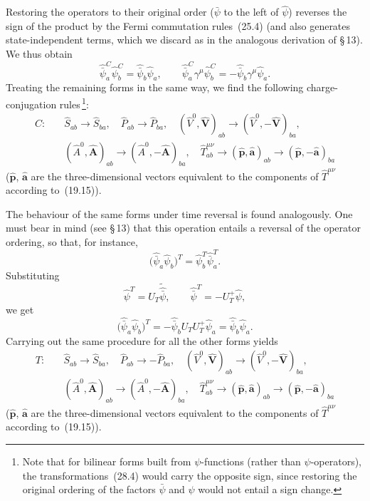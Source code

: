 Restoring the operators to their original order ($\bar\psi$ to the left of $\widehat\psi$) reverses the sign of the product by the Fermi commutation rules~(25.4) (and also generates state-independent terms, which we discard as in the analogous derivation of \S\,13). We thus obtain
\[
\widehat{\bar\psi}^C_a\widehat\psi^C_b = \widehat{\bar\psi}_b\widehat\psi_a,\qquad \widehat{\bar\psi}^C_a\gamma^\mu\widehat\psi^C_b = -\widehat{\bar\psi}_b\gamma^\mu\widehat\psi_a.
\]
Treating the remaining forms in the same way, we find the following charge-conjugation rules\,\footnote{Note that for bilinear forms built from $\psi$-functions (rather than $\psi$-operators), the transformations~(28.4) would carry the opposite sign, since restoring the original ordering of the factors $\bar\psi$ and $\psi$ would not entail a sign change.}:
\begin{equation}
\begin{aligned}
C:\quad &\widehat S_{ab} \to \widehat S_{ba},\quad \widehat P_{ab} \to \widehat P_{ba},\quad (\widehat V^0,\widehat{\mathbf{V}})_{ab} \to (\widehat V^0,-\widehat{\mathbf{V}})_{ba},\\
&(\widehat A^0,\widehat{\mathbf{A}})_{ab} \to (\widehat A^0,-\widehat{\mathbf{A}})_{ba},\quad \widehat T^{\mu\nu}_{ab} \to (\widehat{\mathbf{p}},\widehat{\mathbf{a}})_{ab} \to (\widehat{\mathbf{p}},-\widehat{\mathbf{a}})_{ba}
\end{aligned}
\tag{28.4}
\end{equation}
($\widehat{\mathbf{p}}$, $\widehat{\mathbf{a}}$ are the three-dimensional vectors equivalent to the components of $\widehat T^{\mu\nu}$ according to~(19.15)).

The behaviour of the same forms under time reversal is found analogously. One must bear in mind (see \S\,13) that this operation entails a reversal of the operator ordering, so that, for instance,
\[
\bigl(\widehat{\bar\psi}_a\widehat\psi_b\bigr)^T = \widehat\psi^T_b\widehat{\bar\psi}^T_a.
\]
Substituting
\begin{equation}
\widehat\psi^T = U_T\widetilde{\widehat{\bar\psi}},\qquad \widehat{\bar\psi}^T = -U_T^+\widehat\psi,
\tag{28.5}
\end{equation}
we get
\[
\bigl(\widehat{\bar\psi}_a\widehat\psi_b\bigr)^T = -\widehat{\bar\psi}_bU_TU_T^+\widehat\psi_a = \widehat{\bar\psi}_b\widehat\psi_a.
\]
Carrying out the same procedure for all the other forms yields
\begin{equation}
\begin{aligned}
T:\quad &\widehat S_{ab} \to \widehat S_{ba},\quad \widehat P_{ab} \to -\widehat P_{ba},\quad (\widehat V^0,\widehat{\mathbf{V}})_{ab} \to (\widehat V^0,-\widehat{\mathbf{V}})_{ba},\\
&(\widehat A^0,\widehat{\mathbf{A}})_{ab} \to (\widehat A^0,-\widehat{\mathbf{A}})_{ba},\quad \widehat T^{\mu\nu}_{ab} \to (\widehat{\mathbf{p}},\widehat{\mathbf{a}})_{ab} \to (\widehat{\mathbf{p}},-\widehat{\mathbf{a}})_{ba}
\end{aligned}
\tag{28.6}
\end{equation}
($\widehat{\mathbf{p}}$, $\widehat{\mathbf{a}}$ are the three-dimensional vectors equivalent to the components of $\widehat T^{\mu\nu}$ according to~(19.15)).

